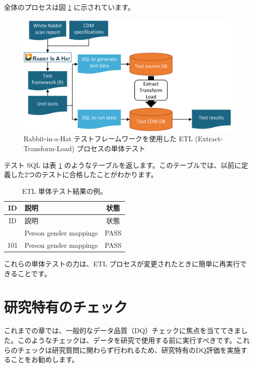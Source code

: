 \documentclass[
  11pt]{book}
\theoremstyle{definition}
\theoremstyle{definition}
\theoremstyle{definition}
\theoremstyle{definition}
\theoremstyle{remark}
\begin{document}
全体のプロセスは図 \ref{fig:testFramework} に示されています。

\begin{figure}

{\centering \includegraphics[width=0.9\linewidth]{images/DataQuality/testFramework} 

}

\caption{Rabbit-in-a-Hat テストフレームワークを使用した ETL (Extract-Transform-Load) プロセスの単体テスト}\label{fig:testFramework}
\end{figure}

テスト SQL は表 \ref{tab:exampleTestResults} のようなテーブルを返します。このテーブルでは、以前に定義した2つのテストに合格したことがわかります。

\begin{longtable}[]{@{}clc@{}}
\caption{\label{tab:exampleTestResults} ETL 単体テスト結果の例。}\tabularnewline
\toprule\noalign{}
ID & 説明 & 状態 \\
\midrule\noalign{}
\endfirsthead
\toprule\noalign{}
ID & 説明 & 状態 \\
\midrule\noalign{}
\endhead
\bottomrule\noalign{}
\endlastfoot
101 & Person gender mappings & PASS \\
101 & Person gender mappings & PASS \\
\end{longtable}

これらの単体テストの力は、ETL プロセスが変更されたときに簡単に再実行できることです。

\section{研究特有のチェック}\label{ux7814ux7a76ux7279ux6709ux306eux30c1ux30a7ux30c3ux30af}


これまでの章では、一般的なデータ品質（DQ）チェックに焦点を当ててきました。このようなチェックは、データを研究で使用する前に実行すべきです。これらのチェックは研究質問に関わらず行われるため、研究特有のDQ評価を実施することをお勧めします。
\end{document}
